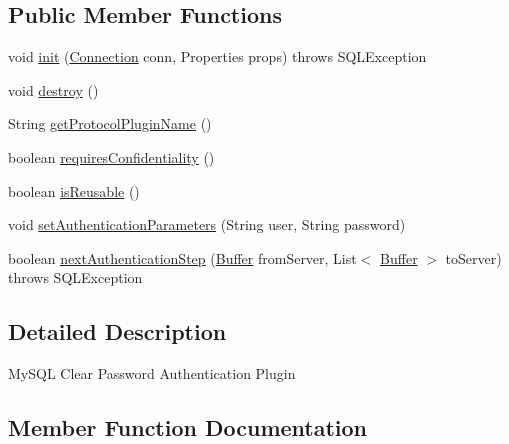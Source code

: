 \subsection*{Public Member Functions}
\begin{DoxyCompactItemize}
\item 
void \mbox{\hyperlink{classcom_1_1mysql_1_1jdbc_1_1authentication_1_1_mysql_clear_password_plugin_a95aa0f048c17c5acf28095eed0bd726a}{init}} (\mbox{\hyperlink{interfacecom_1_1mysql_1_1jdbc_1_1_connection}{Connection}} conn, Properties props)  throws S\+Q\+L\+Exception 
\item 
void \mbox{\hyperlink{classcom_1_1mysql_1_1jdbc_1_1authentication_1_1_mysql_clear_password_plugin_aaa5b467a158bc2410bc23c3f5283abe3}{destroy}} ()
\item 
String \mbox{\hyperlink{classcom_1_1mysql_1_1jdbc_1_1authentication_1_1_mysql_clear_password_plugin_af847af9fb6871a67066bdce231fb024e}{get\+Protocol\+Plugin\+Name}} ()
\item 
boolean \mbox{\hyperlink{classcom_1_1mysql_1_1jdbc_1_1authentication_1_1_mysql_clear_password_plugin_adcc96152e04ea268273ce4153c8e97e4}{requires\+Confidentiality}} ()
\item 
boolean \mbox{\hyperlink{classcom_1_1mysql_1_1jdbc_1_1authentication_1_1_mysql_clear_password_plugin_aa780df1f828468540fcb6f54fac0d5e3}{is\+Reusable}} ()
\item 
void \mbox{\hyperlink{classcom_1_1mysql_1_1jdbc_1_1authentication_1_1_mysql_clear_password_plugin_a1fc50442576ef3ff00a914440398f4b7}{set\+Authentication\+Parameters}} (String user, String password)
\item 
boolean \mbox{\hyperlink{classcom_1_1mysql_1_1jdbc_1_1authentication_1_1_mysql_clear_password_plugin_afe852978e8b5462d13f6f60bc8d7d6be}{next\+Authentication\+Step}} (\mbox{\hyperlink{classcom_1_1mysql_1_1jdbc_1_1_buffer}{Buffer}} from\+Server, List$<$ \mbox{\hyperlink{classcom_1_1mysql_1_1jdbc_1_1_buffer}{Buffer}} $>$ to\+Server)  throws S\+Q\+L\+Exception 
\end{DoxyCompactItemize}


\subsection{Detailed Description}
My\+S\+QL Clear Password Authentication Plugin 

\subsection{Member Function Documentation}
\mbox{\label{classcom_1_1mysql_1_1jdbc_1_1authentication_1_1_mysql_clear_password_plugin_aaa5b467a158bc2410bc23c3f5283abe3}} 
